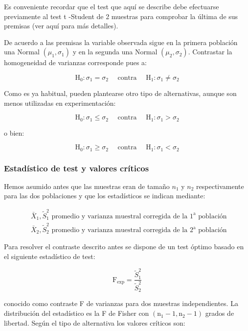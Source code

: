 \documentclass[
]{article}
\begin{document}
Es conveniente recordar que el test que aquí se describe debe efectuarse previamente al test t -Student de 2 muestras para comprobar la última de sus premisas (ver aquí para más detalles).

De acuerdo a las premisas la variable observada sigue en la primera población una Normal \(\left(\mu_{1}, \sigma_{1}\right)\) y en la segunda una Normal \(\left(\mu_{2}, \sigma_{2}\right)\). Contrastar la homogeneidad de varianzas corresponde pues a:

\[
\mathrm{H}_{0}: \sigma_{1}=\sigma_{2} \quad \text { contra } \quad \mathrm{H}_{1}: \sigma_{1} \neq \sigma_{2}
\]

Como es ya habitual, pueden plantearse otro tipo de alternativas, aunque son menos utilizadas en experimentación:

\[
\mathrm{H}_{0}: \sigma_{1} \leq \sigma_{2} \quad \text { contra } \quad \mathrm{H}_{1}: \sigma_{1}>\sigma_{2}
\]

o bien:

\[
\mathrm{H}_{0}: \sigma_{1} \geq \sigma_{2} \quad \text { contra } \quad \mathrm{H}_{1}: \sigma_{1}<\sigma_{2}
\]

\subsubsection{Estadístico de test y valores críticos}\label{estaduxedstico-de-test-y-valores-cruxedticos-1}

Hemos asumido antes que las muestras eran de tamaño \(n_{1}\) y \(n_{2}\) respectivamente para las dos poblaciones y que los estadísticos se indican mediante:

\[
\begin{aligned}
& \bar{X}_{1}, \widetilde{S}_{1}^{2} \text { promedio y varianza muestral corregida de la } 1^{\mathrm{a}} \text { población } \\
& \bar{X}_{2}, \widetilde{S}_{2}^{2} \text { promedio y varianza muestral corregida de la } 2^{\mathrm{a}} \text { población }
\end{aligned}
\]

Para resolver el contraste descrito antes se dispone de un test óptimo basado en el siguiente estadístico de test:

\[
\mathrm{F}_{\exp }=\frac{\widetilde{S}_{1}^{2}}{\widetilde{S}_{2}^{2}}
\]

conocido como contraste F de varianzas para dos muestras independientes. La distribución del estadístico es la F de Fisher con \(\left(\mathrm{n}_{1}-1, \mathrm{n}_{2}-1\right)\) grados de libertad. Según el tipo de alternativa los valores críticos son:
\end{document}
